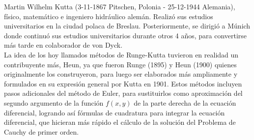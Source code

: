 \documentclass[a4paper,12pt]{article}
\begin{document}
Martin Wilhelm Kutta (3-11-1867 Pitschen, Polonia - 25-12-1944 Alemania), físico, matemático e ingeniero hidráulico alemán. Realizó sus estudios universitarios en la ciudad polaca de Breslau. Posteriormente, se dirigió a Múnich donde continuó sus estudios universitarios durante otros 4 años, para convertirse más tarde en colaborador de von Dyck.\\
La idea de los hoy llamados métodos de Runge-Kutta tuvieron en realidad un contribuyente más, Heun, ya que fueron Runge (1895) y Heun (1900) quienes originalmente los construyeron, para luego ser elaborados más ampliamente y formulados en su expresión general por Kutta en 1901. Estos métodos incluyen pasos adicionales del método de Euler, para sustituirlos como aproximación del segundo argumento de la función \(f(x, y)\) de la parte derecha de la ecuación diferencial, logrando así fórmulas de cuadratura para integrar la ecuación diferencial, que hicieran más rápido el cálculo de la solución del Problema de Cauchy de primer orden.
\end{document}
